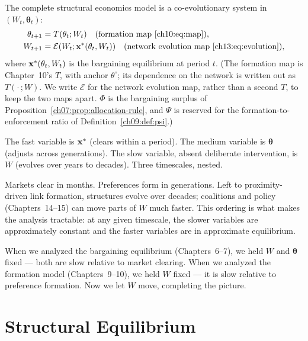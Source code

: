 \documentclass[../structural_economics_book.tex]{subfiles}
\begin{document}
\begin{definition}\label{ch13:thm:coevolution}
The complete structural economics model is a co-evolutionary system in $(W_t, \boldsymbol{\theta}_t)$:
\begin{align}
\theta_{t+1} &= T(\theta_t; W_t) \quad \text{(formation map~\eqref{ch10:eq:map})}, \label{ch13:eq:coev_theta} \\
W_{t+1} &= \mathcal{E}(W_t; \mathbf{x}^*(\theta_t, W_t)) \quad \text{(network evolution map~\eqref{ch13:eq:evolution})}, \label{ch13:eq:coev_W}
\end{align}
where $\mathbf{x}^*(\theta_t, W_t)$ is the bargaining equilibrium at period $t$. (The formation map is Chapter~10's $T$, with anchor $\theta^{\circ}$; its dependence on the network is written out as $T(\cdot\,; W)$. We write $\mathcal{E}$ for the network evolution map, rather than a second $T$, to keep the two maps apart. $\Phi$ is the bargaining surplus of Proposition~\ref{ch07:prop:allocation-rule}, and $\Psi$ is reserved for the formation-to-enforcement ratio of Definition~\ref{ch09:def:psi}.)

The fast variable is $\mathbf{x}^*$ (clears within a period). The medium variable is $\boldsymbol{\theta}$ (adjusts across generations). The slow variable, absent deliberate intervention, is $W$ (evolves over years to decades). Three timescales, nested.
\end{definition}

\begin{intuition}
Markets clear in months. Preferences form in generations. Left to proximity-driven link formation, structures evolve over decades; coalitions and policy (Chapters~14--15) can move parts of $W$ much faster. This ordering is what makes the analysis tractable: at any given timescale, the slower variables are approximately constant and the faster variables are in approximate equilibrium.

When we analyzed the bargaining equilibrium (Chapters~6--7), we held $W$ and $\boldsymbol{\theta}$ fixed --- both are slow relative to market clearing. When we analyzed the formation model (Chapters~9--10), we held $W$ fixed --- it is slow relative to preference formation. Now we let $W$ move, completing the picture.
\end{intuition}


\section{Structural Equilibrium}
\label{ch13:sec:structural_eq}
\end{document}
